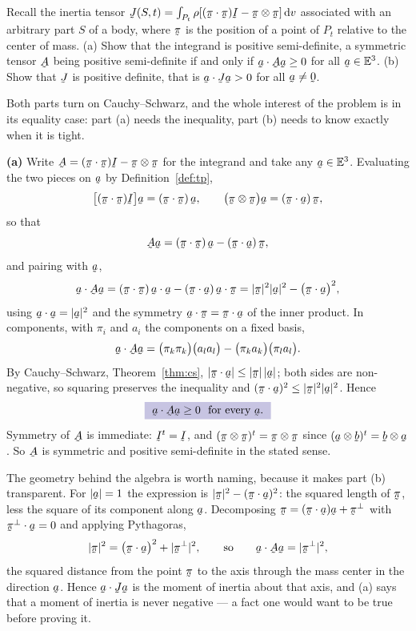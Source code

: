 \begin{problem}
Recall the inertia tensor $\vek{J}(S,t)=\int_{P_{t}}\rho[(\ip{\vek\pi}
{\vek\pi})\I-\vek\pi\otimes\vek\pi]\,\dl v$ associated with an
arbitrary part $S$ of a body, where $\vek\pi$ is the position of a
point of $P_{t}$ relative to the center of mass.
\textup{(a)} Show that the integrand is positive semi-definite, a
symmetric tensor $\bA$ being positive semi-definite if and only if
$\ip\ba{\bA\ba}\geq0$ for all $\ba\in\Vt$.
\textup{(b)} Show that $\vek{J}$ is positive definite, that is
$\ip\ba{\vek{J}\ba}>0$ for all $\ba\neq\bze$.
\end{problem}

\begin{solution}
Both parts turn on Cauchy--Schwarz, and the whole interest of the
problem is in its equality case: part (a) needs the inequality, part
(b) needs to know exactly when it is tight.

\medskip
\noindent\textbf{(a)}
Write $\bA=(\ip{\vek\pi}{\vek\pi})\I-\vek\pi\otimes\vek\pi$ for the
integrand and take any $\ba\in\Vt$. Evaluating the two pieces on $\ba$
by Definition~\ref{def:tp},
\[
   \big[(\ip{\vek\pi}{\vek\pi})\I\big]\ba
   =(\ip{\vek\pi}{\vek\pi})\,\ba ,
   \qquad
   \big(\vek\pi\otimes\vek\pi\big)\ba
   =(\ip{\vek\pi}\ba)\,\vek\pi ,
\]
so that
\[
   \bA\ba=(\ip{\vek\pi}{\vek\pi})\,\ba-(\ip{\vek\pi}\ba)\,\vek\pi ,
\]
and pairing with $\ba$,
\[
   \ip\ba{\bA\ba}
   =(\ip{\vek\pi}{\vek\pi})\,\ip\ba\ba
    -(\ip{\vek\pi}\ba)\,\ip\ba{\vek\pi}
   =|\vek\pi|^{2}|\ba|^{2}-\big(\ip{\vek\pi}\ba\big)^{2},
\]
using $\ip\ba\ba=|\ba|^{2}$ and the symmetry
$\ip\ba{\vek\pi}=\ip{\vek\pi}\ba$ of the inner product. In components,
with $\pi_{i}$ and $a_{i}$ the components on a fixed basis,
\[
   \ip\ba{\bA\ba}
   =\big(\pi_{k}\pi_{k}\big)\big(a_{l}a_{l}\big)
   -\big(\pi_{k}a_{k}\big)\big(\pi_{l}a_{l}\big) .
\]
By Cauchy--Schwarz, Theorem~\ref{thm:cs},
$|\ip{\vek\pi}\ba|\leq|\vek\pi|\,|\ba|$; both sides are non-negative,
so squaring preserves the inequality and
$(\ip{\vek\pi}\ba)^{2}\leq|\vek\pi|^{2}|\ba|^{2}$. Hence
\[
   \boxed{\ \ip\ba{\bA\ba}\geq0\ \text{ for every }\ba .\ }
\]
Symmetry of $\bA$ is immediate: $\I^{t}=\I$, and
$(\vek\pi\otimes\vek\pi)^{t}=\vek\pi\otimes\vek\pi$ since
$(\ba\otimes\bb)^{t}=\bb\otimes\ba$. So $\bA$ is symmetric and
positive semi-definite in the stated sense.

The geometry behind the algebra is worth naming, because it makes part
(b) transparent. For $|\ba|=1$ the expression is
$|\vek\pi|^{2}-(\ip{\vek\pi}\ba)^{2}$: the squared length of
$\vek\pi$, less the square of its component along $\ba$. Decomposing
$\vek\pi=(\ip{\vek\pi}\ba)\ba+\vek\pi^{\perp}$ with
$\ip{\vek\pi^{\perp}}\ba=0$ and applying Pythagoras,
\[
   |\vek\pi|^{2}=\big(\ip{\vek\pi}\ba\big)^{2}+|\vek\pi^{\perp}|^{2},
   \qquad\text{so}\qquad
   \ip\ba{\bA\ba}=|\vek\pi^{\perp}|^{2} ,
\]
the squared distance from the point $\vek\pi$ to the axis through the
mass center in the direction $\ba$. Hence $\ip\ba{\vek{J}\ba}$ is the
moment of inertia about that axis, and (a) says that a moment of
inertia is never negative --- a fact one would want to be true before
proving it.


\end{solution}

